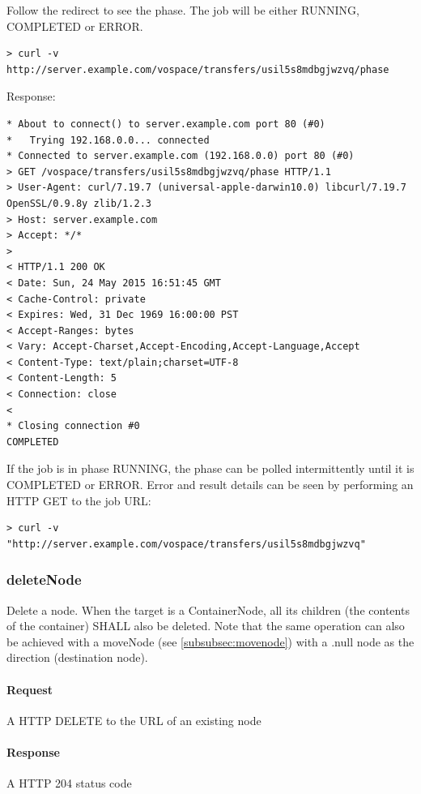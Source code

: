 \documentclass[11pt,a4paper]{ivoa}
\begin{document}
Follow the redirect to see the phase.  The job will be either RUNNING, COMPLETED or ERROR.
\begin{lstlisting}
> curl -v http://server.example.com/vospace/transfers/usil5s8mdbgjwzvq/phase
\end{lstlisting}
Response:
\begin{lstlisting}
* About to connect() to server.example.com port 80 (#0)
*   Trying 192.168.0.0... connected
* Connected to server.example.com (192.168.0.0) port 80 (#0)
> GET /vospace/transfers/usil5s8mdbgjwzvq/phase HTTP/1.1
> User-Agent: curl/7.19.7 (universal-apple-darwin10.0) libcurl/7.19.7 OpenSSL/0.9.8y zlib/1.2.3
> Host: server.example.com
> Accept: */*
>
< HTTP/1.1 200 OK
< Date: Sun, 24 May 2015 16:51:45 GMT
< Cache-Control: private
< Expires: Wed, 31 Dec 1969 16:00:00 PST
< Accept-Ranges: bytes
< Vary: Accept-Charset,Accept-Encoding,Accept-Language,Accept
< Content-Type: text/plain;charset=UTF-8
< Content-Length: 5
< Connection: close
<
* Closing connection #0
COMPLETED
\end{lstlisting}
If the job is in phase RUNNING, the phase can be polled intermittently until it is COMPLETED or ERROR.
Error and result details can be seen by performing an HTTP GET to the job URL:
\begin{lstlisting}
> curl -v "http://server.example.com/vospace/transfers/usil5s8mdbgjwzvq"
\end{lstlisting}

\subsubsection{deleteNode}
\label{subsubsec:deletenode}
Delete a node.
When the target is a ContainerNode, all its children (the contents of the container) SHALL also be deleted.
Note that the same operation can also be achieved with a moveNode (see \ref{subsubsec:movenode}) with a .null node as the direction (destination node).

\paragraph{Request}
A HTTP DELETE to the URL of an existing node

\paragraph{Response}
A HTTP 204 status code
\end{document}
